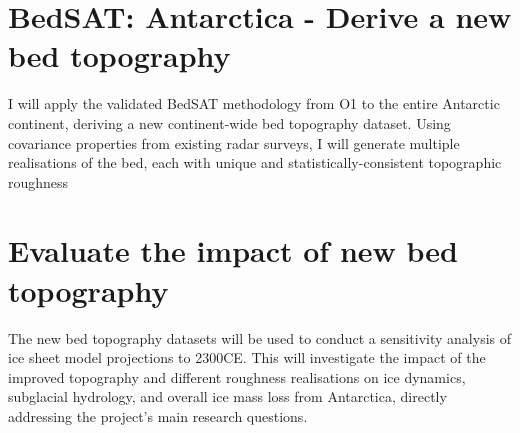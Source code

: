 \section{BedSAT: Antarctica - Derive a new bed topography}
I will apply the validated BedSAT methodology from O1 to the entire Antarctic continent, deriving a new continent-wide bed topography dataset. Using covariance properties from existing radar surveys, I will generate multiple realisations of the bed, each with unique and statistically-consistent topographic roughness%

\section{Evaluate the impact of new bed topography}
The new bed topography datasets will be used to conduct a sensitivity analysis of ice sheet model projections to 2300CE. This will investigate the impact of the improved topography and different roughness realisations on ice dynamics, subglacial hydrology, and overall ice mass loss from Antarctica, directly addressing the project's main research questions.



